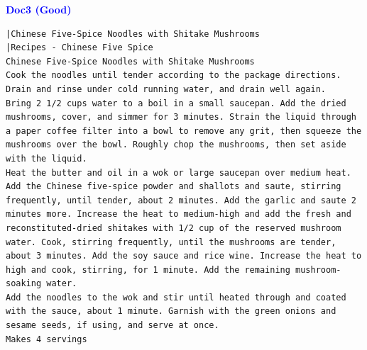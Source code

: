 \documentclass{article}
\begin{document}
\clearpage
\textcolor{blue}{\textbf{Doc3 (Good)}}
\begin{scriptsize}
\begin{Verbatim}[frame=single, framesep=3mm, breaklines=true]
|Chinese Five-Spice Noodles with Shitake Mushrooms
|Recipes - Chinese Five Spice
Chinese Five-Spice Noodles with Shitake Mushrooms
Cook the noodles until tender according to the package directions. Drain and rinse under cold running water, and drain well again.
Bring 2 1/2 cups water to a boil in a small saucepan. Add the dried mushrooms, cover, and simmer for 3 minutes. Strain the liquid through a paper coffee filter into a bowl to remove any grit, then squeeze the mushrooms over the bowl. Roughly chop the mushrooms, then set aside with the liquid.
Heat the butter and oil in a wok or large saucepan over medium heat. Add the Chinese five-spice powder and shallots and saute, stirring frequently, until tender, about 2 minutes. Add the garlic and saute 2 minutes more. Increase the heat to medium-high and add the fresh and reconstituted-dried shitakes with 1/2 cup of the reserved mushroom water. Cook, stirring frequently, until the mushrooms are tender, about 3 minutes. Add the soy sauce and rice wine. Increase the heat to high and cook, stirring, for 1 minute. Add the remaining mushroom-soaking water.
Add the noodles to the wok and stir until heated through and coated with the sauce, about 1 minute. Garnish with the green onions and sesame seeds, if using, and serve at once.
Makes 4 servings
\end{Verbatim}
\end{scriptsize}
\end{document}
